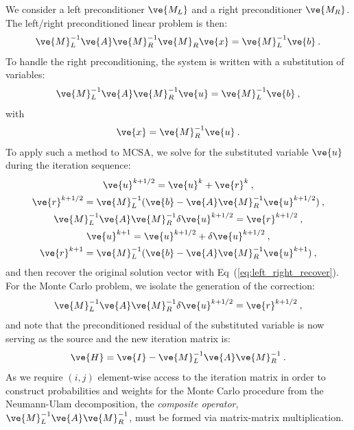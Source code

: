 \documentclass[letterpaper,12pt]{article}
\begin{document}
We consider a left preconditioner $\ve{M_L}$ and a right
preconditioner $\ve{M_R}$. The left/right preconditioned linear
problem is then:
\begin{equation}
  \ve{M}_L^{-1}\ve{A}\ve{M}_R^{-1}\ve{M}_R\ve{x} = \ve{M}_L^{-1}\ve{b}\:.
  \label{eq:left_right_linear_problem}
\end{equation}
To handle the right preconditioning, the system is written with a
substitution of variables:
\begin{equation}
  \ve{M}_L^{-1}\ve{A}\ve{M}_R^{-1}\ve{u} = \ve{M}_L^{-1}\ve{b}\:,
  \label{eq:left_right_subs_problem}
\end{equation}
with
\begin{equation}
  \ve{x} = \ve{M}_R^{-1}\ve{u}\:.
  \label{eq:left_right_recover}
\end{equation}
To apply such a method to MCSA, we solve for the substituted variable
$\ve{u}$ during the iteration sequence:
\begin{subequations}
  \begin{gather}
    \ve{u}^{k+1/2} = \ve{u}^k + \ve{r}^k\:,\\
    \ve{r}^{k+1/2} = \ve{M}_L^{-1}(\ve{b}-\ve{A}\ve{M}_R^{-1}\ve{u}^{k+1/2})\:,\\ 
    \ve{M}_L^{-1}\ve{A}\ve{M}_R^{-1}\delta\ve{u}^{k+1/2} = \ve{r}^{k+1/2}\:,\\ 
    \ve{u}^{k+1} = \ve{u}^{k+1/2} + \delta \ve{u}^{k+1/2}\:,\\
    \ve{r}^{k+1} = \ve{M}_L^{-1}(\ve{b}-\ve{A}\ve{M}_R^{-1}\ve{u}^{k+1})\:,
  \end{gather}
  \label{eq:left_right_mcsa}
\end{subequations}
and then recover the original solution vector with
Eq~(\ref{eq:left_right_recover}). For the Monte Carlo problem, we
isolate the generation of the correction:
\begin{equation}
  \ve{M}_L^{-1}\ve{A}\ve{M}_R^{-1}\delta\ve{u}^{k+1/2} = \ve{r}^{k+1/2}\:,
  \label{eq:left_right_correction}
\end{equation}
and note that the preconditioned residual of the substituted variable
is now serving as the source and the new iteration matrix is:
\begin{equation}
  \ve{H} = \ve{I} - \ve{M}_L^{-1}\ve{A}\ve{M}_R^{-1}\:.
  \label{eq:left_right_iteration_matrix}
\end{equation}
As we require $(i,j)$ element-wise access to the iteration matrix in
order to construct probabilities and weights for the Monte Carlo
procedure from the Neumann-Ulam decomposition, the \textit{composite
  operator}, $\ve{M}_L^{-1}\ve{A}\ve{M}_R^{-1}$, must be formed via
matrix-matrix multiplication. 
\end{document}

